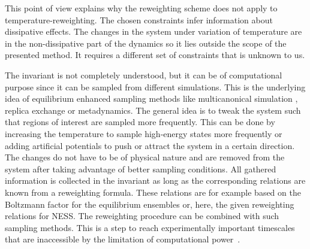 This point of view explains why the reweighting scheme does not apply to temperature-reweighting. The chosen constraints infer information about  dissipative effects. The changes in the system under variation of temperature are in the non-dissipative part of the dynamics so it lies outside the scope of the presented method. It requires a different set of constraints that is unknown to us. 

The invariant is not completely understood, but it can be of computational purpose since it can be sampled from different simulations. This is the underlying idea of equilibrium enhanced sampling methods like multicanonical simulation \cite{janke1998multicanonical}, replica exchange \cite{sugita1999replica} or metadynamics\cite{laio2002escaping}. The general idea is to tweak the system such that regions of interest are sampled more frequently. This can be done by increasing the temperature to sample high-energy states more frequently or adding artificial potentials to push or attract the system in a certain direction. The changes do not have to be of physical nature and are removed from the system after taking advantage of better sampling conditions. All gathered information is collected in the invariant as long as the corresponding relations are known from a reweighting formula. These relations are for example based on the Boltzmann factor for the equilibrium ensembles or, here, the given reweighting relations for NESS.  The reweighting procedure can be combined with such sampling methods. This is a step to reach experimentally important timescales that are inaccessible by the limitation of computational power~\cite{perilla2015molecular}.

